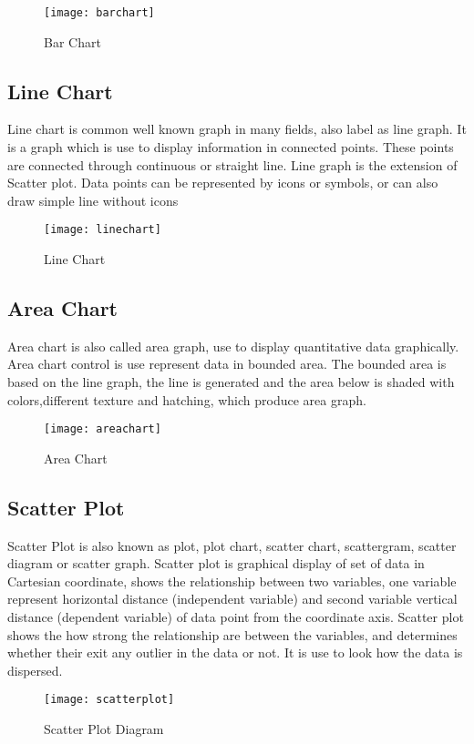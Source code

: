 \begin{figure}[h]
	\texttt{[image: barchart]}
	\centering
	\caption{Bar Chart}
\end{figure}
\subsection{Line Chart}
Line chart is common well known graph in many fields, also label as line graph. It is a graph which is use to display information in connected points. These points are connected through continuous or straight line. Line graph is the extension of Scatter plot. Data points can be represented by icons or symbols, or can also draw simple line without icons
\begin{figure}[h]
	\texttt{[image: linechart]}
	\centering
	\caption{Line Chart}
\end{figure}
\subsection{Area Chart}
Area chart is also called area graph, use to display quantitative data graphically. Area chart control is use represent data in bounded area. The bounded area is based on the line graph, the line is generated and the area below is shaded with colors,different texture and hatching, which produce area graph.
\begin{figure}[h]
	\texttt{[image: areachart]}
	\centering
	\caption{Area Chart}
\end{figure}
\subsection{Scatter Plot}
Scatter Plot is also known as plot, plot chart, scatter chart, scattergram, scatter diagram or scatter graph. Scatter plot is graphical display of set of data in Cartesian coordinate, shows the relationship between two variables, one variable represent horizontal distance (independent variable) and second variable vertical distance (dependent variable) of data point from the coordinate axis. Scatter plot shows the how strong the relationship are between the variables, and determines whether their exit any outlier in the data or not. It is use to look how the data is dispersed.
\begin{figure}[h]
	\texttt{[image: scatterplot]}
	\centering
	\caption{Scatter Plot Diagram}
\end{figure}

